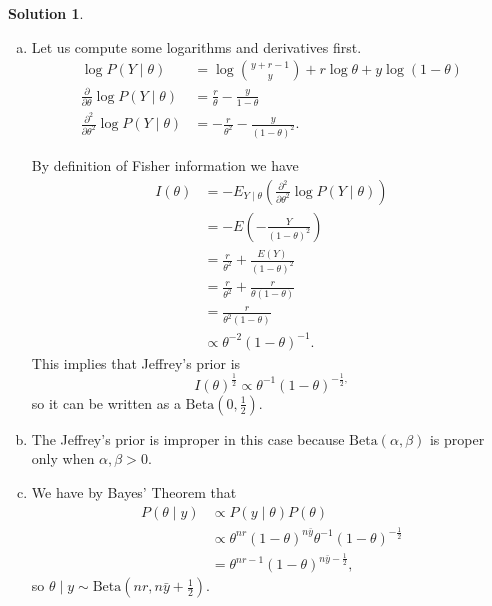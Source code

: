 \documentclass{article}
\theoremstyle{plain}
\theoremstyle{definition}
\newtheorem*{sol*}{Solution}
\begin{document}
\begin{sol*}\
\begin{enumerate}[(a)]
\item Let us compute some logarithms and derivatives first.
\begin{align*}
\log P(Y\mid\theta) &= \log\binom{y+r-1}{y}+r\log\theta+y\log(1-\theta)\\
\frac{\partial}{\partial\theta}\log P(Y\mid\theta)&= \frac{r}{\theta}-\frac{y}{1-\theta}\\
\frac{\partial^2}{\partial\theta^2}\log P(Y\mid\theta)&=-\frac{r}{\theta^2}-\frac{y}{(1-\theta)^2}.
\end{align*}

By definition of Fisher information we have
\begin{align*}
I(\theta) &= -E_{Y\mid\theta}\left(\frac{\partial^2}{\partial\theta^2}\log P(Y\mid\theta)\right)\\
&= -E\left(-\frac{Y}{(1-\theta)^2}\right)\\
&= \frac{r}{\theta^2} +\frac{E(Y)}{(1-\theta)^2}\\
&= \frac{r}{\theta^2}+\frac{r}{\theta(1-\theta)}\\
&= \frac{r}{\theta^2(1-\theta)}\\
&\propto \theta^{-2}(1-\theta)^{-1}.
\end{align*}
This implies that Jeffrey's prior is
\[I(\theta)^{\frac{1}{2}} \propto \theta^{-1}(1-\theta)^{-\frac{1}{2},}\] so it can  be written as a $\mathrm{Beta}(0,\frac{1}{2})$.
\item The Jeffrey's prior is improper in this case because $\mathrm{Beta}(\alpha,\beta)$ is proper only when $\alpha,\beta>0$.
\item We have by Bayes' Theorem that
\begin{align*}
P(\theta\mid y) &\propto P(y\mid \theta)P(\theta)\\
&\propto \theta^{nr}(1-\theta)^{n\bar{y}}\theta^{-1}(1-\theta)^{-\frac{1}{2}}\\
& = \theta^{nr-1}(1-\theta)^{n\bar{y}-\frac{1}{2}},
\end{align*}
so $\theta\mid y\sim \mathrm{Beta}(nr, n\bar{y}+\frac{1}{2})$. 
\end{enumerate}
\end{sol*}
\end{document}
